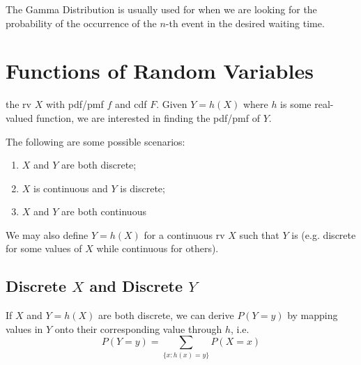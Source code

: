 \documentclass[notoc,notitlepage]{tufte-book}
\begin{document}
\begin{note}
  The Gamma Distribution is usually used for when we are looking for the probability of the occurrence of the $n$-th event in the desired waiting time.
\end{note}



\section{Functions of Random Variables}
\label{sec:functions_of_random_variables}

 the rv $X$ with pdf/pmf $f$ and cdf $F$. Given $Y = h(X)$ where $h$ is some real-valued function, we are interested in finding the pdf/pmf of $Y$.

The following are some possible scenarios:
\begin{enumerate}
  \item $X$ and $Y$ are both discrete;
  \item $X$ is continuous and $Y$ is discrete;
  \item $X$ and $Y$ are both continuous
\end{enumerate}
We may also define $Y = h(X)$ for a continuous rv $X$ such that $Y$ is  (e.g. discrete for some values of $X$ while continuous for others).

\subsection{Discrete $X$ and Discrete $Y$}%
\label{sub:discrete_x_and_discrete_y}

If $X$ and $Y = h(X)$ are both discrete, we can derive $P(Y = y)$ by mapping values in $Y$ onto their corresponding value through $h$, i.e.
\begin{equation*}
  P(Y = y) = \sum_{\{x : h(x) = y\}} P(X = x)
\end{equation*}
\end{document}
